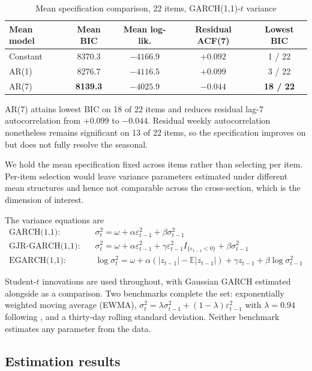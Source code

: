 \documentclass[11pt,a4paper]{article}
\begin{document}
\begin{table}[htbp]
\centering
\caption{Mean specification comparison, 22 items, GARCH(1,1)-$t$ variance}
\label{tab:mean}
\begin{tabular}{lcccc}
\toprule
Mean model & Mean BIC & Mean log-lik. & Residual ACF(7) & Lowest BIC \\
\midrule
Constant & 8370.3 & $-4166.9$ & $+0.092$ & 1 / 22 \\
AR(1)    & 8276.7 & $-4116.5$ & $+0.099$ & 3 / 22 \\
AR(7)    & \textbf{8139.3} & $\mathbf{-4025.9}$ & $-0.044$ & \textbf{18 / 22} \\
\bottomrule
\end{tabular}
\end{table}

AR(7) attains lowest BIC on 18 of 22 items and reduces residual lag-7
autocorrelation from $+0.099$ to $-0.044$. Residual weekly autocorrelation
nonetheless remains significant on 13 of 22 items, so the specification
improves on but does not fully resolve the seasonal.

We hold the mean specification fixed across items rather than selecting per
item. Per-item selection would leave variance parameters estimated under
different mean structures and hence not comparable across the cross-section,
which is the dimension of interest.

The variance equations are
\begin{align}
\text{GARCH(1,1):}\quad
&\sigma_t^2 = \omega + \alpha \varepsilon_{t-1}^2 + \beta \sigma_{t-1}^2 \\[0.3em]
\text{GJR-GARCH(1,1):}\quad
&\sigma_t^2 = \omega + \alpha \varepsilon_{t-1}^2
 + \gamma \varepsilon_{t-1}^2 I_{\{\varepsilon_{t-1}<0\}} + \beta \sigma_{t-1}^2 \\[0.3em]
\text{EGARCH(1,1):}\quad
&\log \sigma_t^2 = \omega
 + \alpha \left( |z_{t-1}| - \mathbb{E}|z_{t-1}| \right)
 + \gamma z_{t-1} + \beta \log \sigma_{t-1}^2
\end{align}

Student-$t$ innovations are used throughout, with Gaussian GARCH estimated
alongside as a comparison. Two benchmarks complete the set: exponentially
weighted moving average (EWMA), $\sigma_t^2 = \lambda \sigma_{t-1}^2
+ (1-\lambda)\varepsilon_{t-1}^2$ with $\lambda = 0.94$ following
\citet{RiskMetrics1996}, and a thirty-day rolling standard deviation. Neither
benchmark estimates any parameter from the data.

\subsection{Estimation results}
\end{document}
